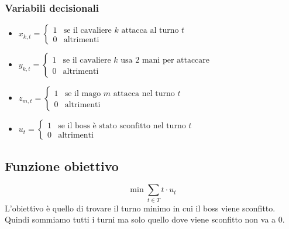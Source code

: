 \documentclass[12pt]{article}
\begin{document}
   \subsubsection{Variabili decisionali}
   \begin{itemize}
    \item $x_{k,t} = \begin{cases} 
        1 & \text{se il cavaliere } k \text{ attacca al turno } t \\ 
        0 & \text{altrimenti} 
    \end{cases}$
    \item $y_{k,t} = \begin{cases} 
        1 & \text{se il cavaliere } k \text{ usa 2 mani per attaccare } \\ 
        0 & \text{altrimenti} 
    \end{cases}$
    \item $z_{m,t} = \begin{cases} 
        1 & \text{se il mago } m \text{ attacca nel turno } t \\ 
        0 & \text{altrimenti} 
    \end{cases}$
    \item $u_t = \begin{cases}
        1 & \text{se il boss è stato sconfitto nel turno } t \\
        0 & \text{altrimenti}
    \end{cases}$
    \end{itemize}
   \subsection{Funzione obiettivo}
    \begin{equation}
        \min \sum_{t \in T} t \cdot u_t
    \end{equation}
    L'obiettivo è quello di trovare il turno minimo in cui il boss viene sconfitto. Quindi sommiamo tutti i turni ma solo quello dove viene sconfitto non va a 0.\\
    \newpage
\end{document}
